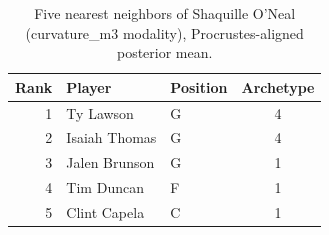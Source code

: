 \begin{table}[htbp]
  \centering\small
  \begin{tabular}{rllc}
    \toprule
    Rank & Player & Position & Archetype \\
    \midrule
    1 & Ty Lawson & G & 4 \\
    2 & Isaiah Thomas & G & 4 \\
    3 & Jalen Brunson & G & 1 \\
    4 & Tim Duncan & F & 1 \\
    5 & Clint Capela & C & 1 \\
    \bottomrule
  \end{tabular}
  \caption{Five nearest neighbors of Shaquille O'Neal (curvature_m3 modality), Procrustes-aligned posterior mean.}
  \label{tab:Shaquille_O_Neal_neighbors_curvature_m3}
\end{table}


